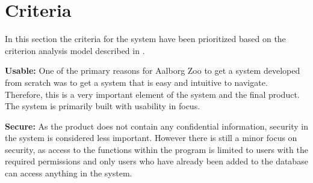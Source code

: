 \section{Criteria} \label{sc:criteria}
In this section the criteria for the system have been prioritized based on the criterion analysis model described in \cite[chap 9]{OOAD}.

\begin{table}[H]
    \centering
    \caption{Checklist for prioritizing design criteria}
    \label{tab:my_label}
\end{table}

\textbf{Usable:} One of the primary reasons for Aalborg Zoo to get a system developed from scratch was to get a system that is easy and intuitive to navigate. Therefore, this is a very important element of the system and the final product. The system is primarily built with usability in focus.

\textbf{Secure:} As the product does not contain any confidential information, security in the system is considered less important. However there is still a minor focus on security, as access to the functions within the program is limited to users with the required permissions and only users who have already been added to the database can access anything in the system.

